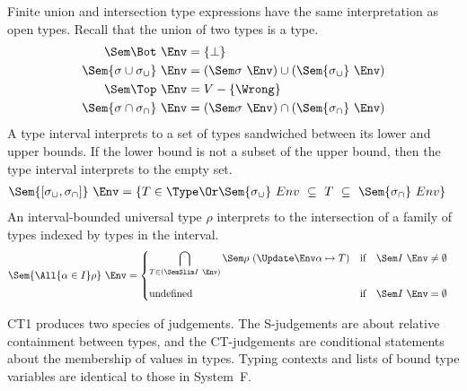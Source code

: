\documentclass{amsart}
\begin{document}
\label{interp-ct-types}

Finite union and intersection type expressions have the same
interpretation as open types. Recall that the union of two types
is a type.
\begin{align*}
\Sem\Bot~\Env &=\{\bot\}\\
\Sem{\sigma\cup\sigma_\cup}~\Env &= (\Sem\sigma~\Env) \cup
(\Sem{\sigma_\cup}~\Env)\\
\Sem\Top~\Env &=V-\{\Wrong\}\\
\Sem{\sigma\cap\sigma_\cap}~\Env &= (\Sem\sigma~\Env) \cap
(\Sem{\sigma_\cap}~\Env)
\end{align*}
A type interval interprets to a set of types sandwiched between
its lower and upper bounds. If the lower bound is not a subset of
the upper bound, then the type interval interprets to the empty
set.
\begin{align*}
\Sem{[\sigma_\cup,\sigma_\cap]}~\Env &= \{T\in\Type\Or
\Sem{\sigma_\cup}~Env\ \subseteq\ T\ \subseteq\ \Sem{\sigma_\cap}~Env\}
\end{align*}
An interval-bounded universal type $\rho$ interprets to the
intersection of a family of types indexed by types in the
interval.
\begin{align*}
\Sem{\All{\alpha\in I}\rho}~\Env &=
\begin{cases}
\displaystyle\bigcap_{T\in(\SemSlim I~\Env)}
\Sem\rho~(\Update\Env\alpha\mapsto T)&\text{if}\quad\Sem I~\Env\neq\emptyset\\[2em]
\mbox{undefined}&\text{if}\quad\Sem I~\Env=\emptyset
\end{cases}
\end{align*}


CT1 produces two species of judgements. The S-judgements are
about relative containment between types, and the CT-judgements
are conditional statements about the membership of values in
types. Typing contexts and lists of bound type variables are
identical to those in System~F.
\end{document}
